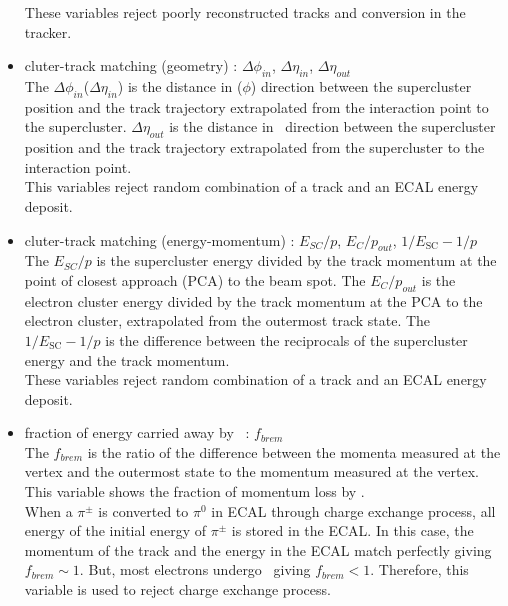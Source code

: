 \begin{itemize}
These variables reject poorly reconstructed tracks and conversion 
in the tracker.    


\item cluter-track matching (geometry) : $\Delta \phi_{in}$, $\Delta \eta_{in}$, 
                                         $\Delta \eta_{out}$ \\  

The $\Delta \phi_{in}$($\Delta \eta_{in}$) is the distance in \Eta($\phi$) direction 
between the supercluster position and the track trajectory extrapolated from 
the interaction point to the supercluster. 
$\Delta \eta_{out}$ is the distance in \Eta\ direction
between the supercluster position and the track trajectory extrapolated 
from the supercluster to the interaction point. \\

This variables reject random combination of a track and an ECAL energy deposit. 

\item cluter-track matching (energy-momentum) : $E_{SC}/p$, $E_{C}/p_{out}$, 
                                                $1/E_\textrm{SC} - 1/p$ \\ 

The $E_{SC}/p$ is the supercluster energy divided by the track momentum 
at the point of closest approach (PCA) to the beam spot.
The $E_C/p_{out}$ is the electron cluster energy divided by the track momentum 
at the PCA to the electron cluster, extrapolated from the outermost track state. 
The $1/E_\textrm{SC} - 1/p$ is the difference between the reciprocals 
of the supercluster energy and the track momentum. \\

These variables reject random combination of a track and an ECAL energy deposit. 

\item fraction of energy carried away by \brem\ : $f_{brem}$  \\

The $f_{brem}$ is the ratio of the difference between the momenta measured 
at the vertex and the outermost state to the momentum measured at the 
vertex. This variable shows the fraction of momentum loss by \brem.  \\ 

When a $\pi^\pm$ is converted to $\pi^0$ in ECAL through charge exchange 
process, all energy of the initial energy of $\pi^\pm$ is stored in the 
ECAL. In this case, the momentum of the track and the energy in the ECAL 
match perfectly giving $f_{brem}\sim 1$. But, most electrons undergo \brem\ 
giving $f_{brem} < 1$. Therefore, this variable is used to reject
charge exchange process.  



\end{itemize}

